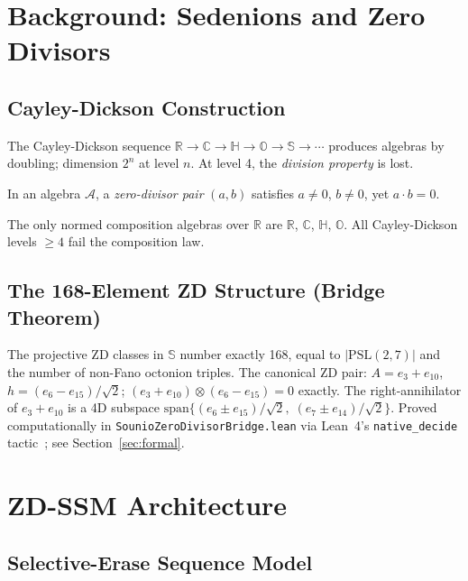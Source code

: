 \documentclass{article}
\begin{document}
\section{Background: Sedenions and Zero Divisors}

\subsection{Cayley-Dickson Construction}

The Cayley-Dickson sequence $\mathbb{R} \to \mathbb{C} \to \mathbb{H} \to
\mathbb{O} \to \mathbb{S} \to \cdots$ produces algebras by doubling;
dimension $2^n$ at level $n$.
At level 4, the \emph{division property} is lost.

\begin{definition}
In an algebra $\mathcal{A}$, a \emph{zero-divisor pair} $(a,b)$ satisfies
$a \neq 0$, $b \neq 0$, yet $a \cdot b = 0$.
\end{definition}

\begin{theorem}[Hurwitz 1898]
The only normed composition algebras over $\mathbb{R}$ are $\mathbb{R}$,
$\mathbb{C}$, $\mathbb{H}$, $\mathbb{O}$.
All Cayley-Dickson levels $\geq 4$ fail the composition law.
\end{theorem}

\subsection{The 168-Element ZD Structure (Bridge Theorem)}

The projective ZD classes in $\mathbb{S}$ number exactly 168,
equal to $|\mathrm{PSL}(2,7)|$ and the number of non-Fano octonion triples.
The canonical ZD pair: $A = e_3 + e_{10}$, $h = (e_6 - e_{15})/\sqrt{2}$;
$(e_3 + e_{10}) \otimes (e_6 - e_{15}) = 0$ exactly.
The right-annihilator of $e_3 + e_{10}$ is a 4D subspace
$\mathrm{span}\{(e_6 \pm e_{15})/\sqrt{2},\; (e_7 \pm e_{14})/\sqrt{2}\}$.
Proved computationally in \texttt{SounioZeroDivisorBridge.lean} via
Lean~4's \texttt{native\_decide} tactic~\cite{demoura2021lean4};
see Section~\ref{sec:formal}.

\section{ZD-SSM Architecture}

\subsection{Selective-Erase Sequence Model}
\end{document}
